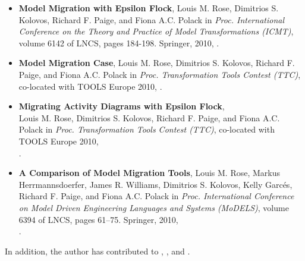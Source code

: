 {\begin{itemize}
		\item \textbf{Model Migration with Epsilon Flock}, Louis M. Rose, Dimitrios S. Kolovos, Richard F. Paige, and Fiona A.C. Polack in \textit{Proc. International Conference on the Theory and Practice of Model Transformations (ICMT)}, volume 6142 of LNCS, pages 184-198. Springer, 2010, \cite{rose10flock}.
	
		\item \textbf{Model Migration Case}, Louis M. Rose, Dimitrios S. Ko\-lo\-vos, Richard F. Paige, and Fiona A.C. Polack in \textit{Proc. Transformation Tools Contest (TTC)}, co-located with TOOLS Europe 2010, \cite{rose10ttc_case}.
	
		\item \textbf{Migrating Activity Diagrams with Epsilon Flock}, \\ Louis M. Rose, Dimitrios S. Kolovos, Richard F. Paige, and Fiona A.C. Polack in \textit{Proc. Transformation Tools Contest (TTC)}, co-located with TOOLS Europe 2010, \\ \cite{rose10ttc_solution}.
		
		\item \textbf{A Comparison of Model Migration Tools}, Louis M. Rose, Markus Herrmannsdoerfer, James R. Williams, Dimitrios S. Kolovos, Kelly Garc\'{e}s, Richard F. Paige, and Fiona A.C. Polack in \textit{Proc. International Conference on Model Driven Engineering Languages and Systems (MoDELS)}, volume 6394 of LNCS, pages 61–75. Springer, 2010, \\
		\cite{rose10comparison}.
	\end{itemize}

	In addition, the author has contributed to \cite{kolovos07ewl}, \cite{paige08fptc}, \cite{kolovos10eugenia} and \cite{rose10coevolution}.
}